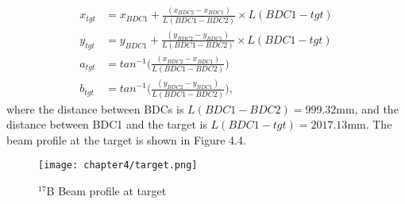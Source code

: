 \begin{align}
    x_{tgt} &= x_{BDC1} + \frac{(x_{BDC2} - x_{BDC1})}{L(BDC1 - BDC2)} \times L(BDC1 - tgt)\\
    y_{tgt} &= y_{BDC1} + \frac{(y_{BDC2} - y_{BDC1})}{L(BDC1 - BDC2)} \times L(BDC1 - tgt)\\
    a_{tgt} &= tan^{-1} \bigg( \frac{(x_{BDC2} - x_{BDC1})}{L(BDC1 - BDC2)} \bigg)\\
    b_{tgt} &= tan^{-1} \bigg( \frac{(y_{BDC2} - y_{BDC1})}{L(BDC1 - BDC2)} \bigg),
\end{align}
where the distance between BDCs is $L(BDC1 - BDC2) = 999.32 $mm, and the distance between BDC1 and the target is $L(BDC1 - tgt) = 2017.13$mm. The beam profile at the target is shown in Figure 4.4. 
\begin{figure}[h]
    \centering
    \texttt{[image: chapter4/target.png]}
    \caption{${}^{17}$B Beam profile at target}
\end{figure}







